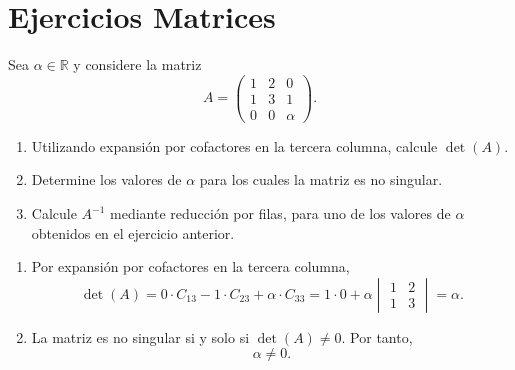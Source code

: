 \documentclass[11pt,a5]{aleph-examen}
\begin{document}
\encabezado

\section*{Ejercicios Matrices}

\begin{preguntas}
\item
Sea \( \alpha \in \mathbb{R} \) y considere la matriz
\[
    A=\begin{pmatrix}
        1 & 2 & 0 \\
        1 & 3 & 1 \\
        0 & 0 & \alpha
    \end{pmatrix}.
\]
\begin{enumerate}
    \item Utilizando expansión por cofactores en la tercera columna, calcule \( \det(A) \).
    \item Determine los valores de \( \alpha \) para los cuales la matriz es no singular.
    \item Calcule \( A^{-1} \) mediante reducción por filas, para uno de los valores de $\alpha$ obtenidos en el ejercicio anterior.
\end{enumerate}

\begin{respuesta}
\begin{enumerate}
    \item Por expansión por cofactores en la tercera columna,
    \[
        \det(A)
        =0\cdot C_{13}-1\cdot C_{23}+\alpha\cdot C_{33}
        =1\cdot 0+\alpha\begin{vmatrix}1 & 2\\ 1 & 3\end{vmatrix}
        =\alpha.
    \]

    \item La matriz es no singular si y solo si \(\det(A)\neq 0\). Por tanto,
    \[
        \alpha\neq 0.
    \]


\end{enumerate}
\end{respuesta}
\end{preguntas}
\end{document}
